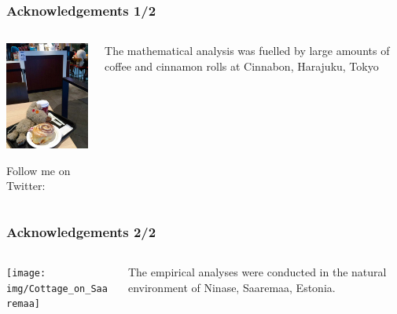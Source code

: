 \begin{frame}
  \frametitle{Acknowledgements 1/2}

  \ungap[1]
  \begin{columns}[T]
    \begin{column}{55mm}
      \includegraphics[width=52mm]{img/ratti_cinnamon_rolls}
      
      \scriptsize
      Follow me on Twitter: 
    \end{column}
    \begin{column}{50mm}
      The mathematical analysis was fuelled by large amounts of coffee and cinnamon rolls at Cinnabon, Harajuku, Tokyo

    \end{column}

  \end{columns}
\end{frame}

\begin{frame}
  \frametitle{Acknowledgements 2/2}

  \ungap[1]
  \begin{columns}[T]
    \begin{column}{55mm}
      \texttt{[image: img/Cottage\_on\_Saaremaa]}
      
    \end{column}
    \begin{column}{50mm}
      The empirical analyses were conducted in the natural environment of Ninase, Saaremaa, Estonia.

    \end{column}

  \end{columns}
\end{frame}

